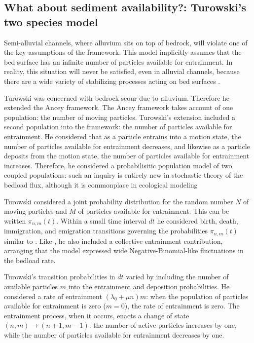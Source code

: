 \subsection{What about sediment availability?: Turowski's two species model} 

Semi-alluvial channels, where alluvium sits on top of bedrock, will violate one of the key assumptions of the \citet{Ancey2008} framework. 
This model implicitly assumes that the bed surface has an infinite number of particles available for entrainment. 
In reality, this situation will never be satisfied, even in alluvial channels, because there are a wide variety of stabilizing processes acting on bed surfaces \citep{Hassan2008, Venditti2016}. 

Turowski was concerned with bedrock scour due to alluvium. 
Therefore he extended the Ancey framework. 
The Ancey framework takes account of one population: the number of moving particles. 
Turowski's extension included a second population into the framework: the number of particles available for entrainment. 
He considered that as a particle entrains into a motion state, the number of particles available for entrainment decreases, and likewise as a particle deposits from the motion state, the number of particles available for entrainment increases. 
Therefore, he considered a probabilisitic population model of two coupled populations: such an inquiry is entirely new in stochastic theory of the bedload flux, although it is commonplace in ecological modeling \citep[e.g.][]{Pielou1977}

Turowski considered a joint probability distribution for the random number $N$ of moving particles and $M$ of particles available for entrainment. 
This can be written $\pi_{n,m}(t)$. 
Within a small time interval $dt$ he considered birth, death, immigration, and emigration transitions governing the probabilities $\pi_{n,m}(t)$ similar to \citet{Ancey2008}. 
Like \citet{Ancey2008}, he also included a collective entrainment contribution, arranging that the model expressed wide Negative-Binomial-like fluctuations in the bedload rate. 

Turowski's transition probabilities in $dt$ varied by including the number of available particles $m$ into the entrainment and deposition probabilities. He considered a rate of entrainment $(\lambda_0 + \mu n)m$: when the population of particles available for entrainment is zero ($m=0$), the rate of entrainment is zero. The entrainment process, when it occurs, enacts a change of state $(n,m)\rightarrow(n+1,m-1)$: the number of active particles increases by one, while the number of particles available for entrainment decreases by one. 

